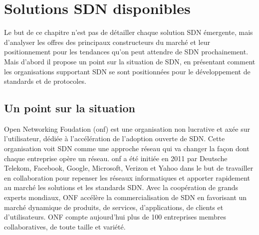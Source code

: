 \chapter{Solutions SDN disponibles}

Le but de ce chapitre n'est pas de détailler chaque solution SDN émergente, mais d'analyser les offres des principaux constructeurs du marché et leur positionnement pour les tendances qu'on peut attendre de SDN prochainement.
Mais d'abord il propose un point sur la situation de SDN, en présentant comment les organisations supportant SDN se sont positionnées pour le développement de standards et de protocoles.




\section{Un point sur la situation}




Open Networking Foudation (\gls{onf}) est une organisation non lucrative et axée sur l'utilisateur, dédiée à l'accélération de l'adoption ouverte de SDN. Cette organisation voit SDN comme une approche réseau qui va changer la façon dont chaque entreprise opère un réseau.
\gls{onf} a été initiée en 2011 par Deutsche Telekom, Facebook, Google, Microsoft, Verizon et Yahoo dans le but de travailler en collaboration pour repenser les réseaux informatiques et apporter rapidement au marché les solutions et les standards SDN. Avec la coopération de grands experts mondiaux, ONF accélère la commercialisation de SDN en favorisant un  marché dynamique de produits, de services, d'applications, de clients et d'utilisateurs. ONF compte aujourd'hui plus de 100 entreprises membres collaboratives, de toute taille et variété. \cite{ONFOverview}


